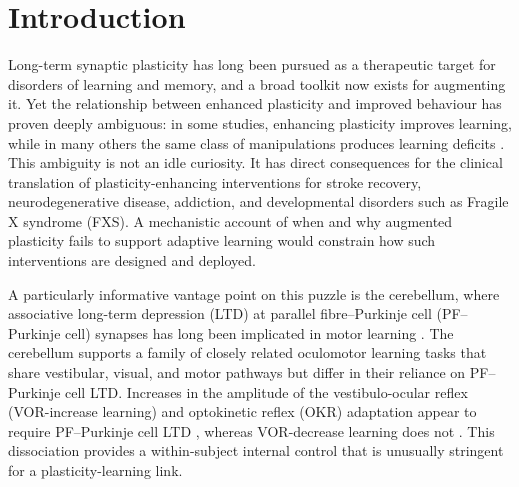 \section{Introduction}

Long-term synaptic plasticity has long been pursued as a therapeutic target for disorders of learning and memory, and a broad toolkit now exists for augmenting it. Yet the relationship between enhanced plasticity and improved behaviour has proven deeply ambiguous: in some studies, enhancing plasticity improves learning, while in many others the same class of manipulations produces learning deficits \cite{koekkoek2005fmr1,nosyreva2006fmr1,nguyenvu2017saturation}. This ambiguity is not an idle curiosity. It has direct consequences for the clinical translation of plasticity-enhancing interventions for stroke recovery, neurodegenerative disease, addiction, and developmental disorders such as Fragile X syndrome (FXS). A mechanistic account of when and why augmented plasticity fails to support adaptive learning would constrain how such interventions are designed and deployed.

A particularly informative vantage point on this puzzle is the cerebellum, where associative long-term depression (LTD) at parallel fibre--Purkinje cell (PF--Purkinje cell) synapses has long been implicated in motor learning \cite{boyden2004cerebellum,raymond2018cerebellum}. The cerebellum supports a family of closely related oculomotor learning tasks that share vestibular, visual, and motor pathways but differ in their reliance on PF--Purkinje cell LTD. Increases in the amplitude of the vestibulo-ocular reflex (VOR-increase learning) and optokinetic reflex (OKR) adaptation appear to require PF--Purkinje cell LTD \cite{boyden2004cerebellum,inoshita2018okr,takeuchi2008delphilin,kimpo2014gating,rowan2018graded}, whereas VOR-decrease learning does not \cite{boyden2004cerebellum,raymond2018cerebellum,kimpo2005vor,kimpo2014gating}. This dissociation provides a within-subject internal control that is unusually stringent for a plasticity-learning link.

